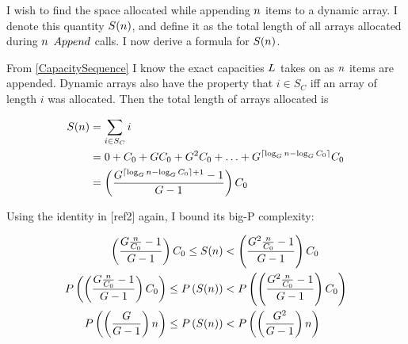 \HdrSpaceComplex

I wish to find the space allocated while appending $n$ items to a dynamic array. I denote this quantity $S(n)$, and define it as the total length of all arrays allocated during $n$ $Append$ calls. I now derive a formula for $S(n)$.

From \ref{CapacitySequence} I know the exact capacities $L$ takes on as $n$ items are appended. Dynamic arrays also have the property that $i \in S_C$ iff an array of length $i$ was allocated. Then the total length of arrays allocated is

\begin{align*}
S(n) &= \sum_{i \in S_C} i\\
&= 0 + C_0 + GC_0 + G^2C_0 + \ldots + G^{\lceil \log_{G} n - \log_{G} C_0 \rceil}C_0\\
&= \left( \frac{G^{\lceil \log_{G} n - \log_{G} C_0 \rceil + 1} - 1}{G - 1} \right) C_0
\end{align*}

Using the identity in [ref2] again, I bound its big-P complexity:

\begin{align*}
\left( \frac{G \frac{n}{C_0} - 1}{G - 1} \right) C_0 \leq S(n) &< \left( \frac{G^2 \frac{n}{C_0} - 1}{G - 1} \right) C_0\\
P\left( \left( \frac{G \frac{n}{C_0} - 1}{G - 1} \right) C_0 \right) \leq P\left( S(n) \right) &< P\left( \left( \frac{G^2 \frac{n}{C_0} - 1}{G - 1} \right) C_0 \right)\\
P\left( \left( \frac{G}{G - 1} \right) n \right) \leq P\left( S(n) \right) &< P\left( \left( \frac{G^2}{G - 1} \right) n \right)
\end{align*}